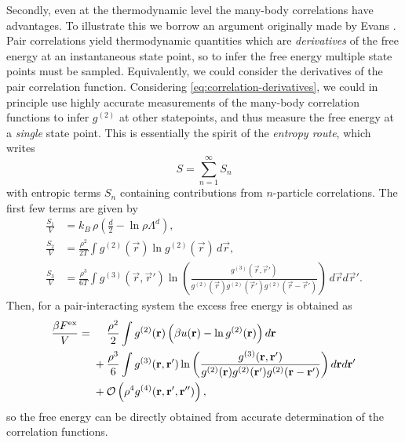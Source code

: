 \documentclass[11pt,twoside]{report}
\begin{document}
Secondly, even at the thermodynamic level the many-body correlations have advantages.
To illustrate this we borrow an argument originally made by Evans \cite{EvansPrivate2019}.
Pair correlations yield thermodynamic quantities which are \emph{derivatives} of the free energy at an instantaneous state point, so to infer the free energy multiple state points must be sampled.
Equivalently, we could consider the derivatives of the pair correlation function.
Considering \eqref{eq:correlation-derivatives}, we could in principle use highly accurate measurements of the many-body correlation functions to infer $g^{(2)}$ at other statepoints, and thus measure the free energy at a \emph{single} state point.
This is essentially the spirit of the \emph{entropy route}, which writes \cite{WallaceJCP1987}
\begin{equation}
  S = \sum_{n=1}^\infty S_n
\end{equation}
with entropic terms $S_n$ containing contributions from $n$-particle correlations.
The first few terms are given by \cite{WallaceJCP1987}
\begin{subequations}
  \begin{align}
    \frac{S_1}{V}%
    &=
    k_B \, \rho \left( \frac{d}{2} - \ln{\rho \Lambda^d} \right),
    \\
    \frac{S_2}{V}%
    &=
    \frac{\rho^2}{2 T}
    \int g^{(2)}(\vec{r}) \ln{g^{(2)}(\vec{r})}
    \, d\vec{r},
    \\
    \frac{S_3}{V}%
    &=
    \frac{\rho^3}{6 T}
    \int g^{(3)}(\vec{r}, \vec{r}')
    \ln{\left(
      \frac{
        g^{(3)}(\vec{r}, \vec{r}')
      }{
        g^{(2)}(\vec{r}) g^{(2)}(\vec{r}') g^{(2)}(\vec{r} - \vec{r}')
      }
      \right)}
    \, d\vec{r} d\vec{r}'.
  \end{align}
\end{subequations}
Then, for a pair-interacting system the excess free energy is obtained as
\begin{equation*}
  \begin{split}
    \frac{\beta F^\mathrm{ex}}{V}
    =& \; \hphantom{ + } \;\,
    \frac{\rho^2}{2} \int g^{(2)}(\vec{r})
    \left( \beta u(\vec{r}) - \ln{g^{(2)}(\vec{r})} \right)
    d\vec{r}
    \\ & \;
    + \frac{\rho^3}{6}
    \int g^{(3)}(\vec{r}, \vec{r}')
    \ln{\left(
      \frac{
        g^{(3)}(\vec{r}, \vec{r}')
      }{
        g^{(2)}(\vec{r}) g^{(2)}(\vec{r}') g^{(2)}(\vec{r} - \vec{r}')
      }
      \right)}
    \, d\vec{r} d\vec{r}'
    \\ & \;
    + \mathcal{O}\left( \rho^4 g^{(4)}(\vec{r}, \vec{r}', \vec{r}'') \right),
  \end{split}
\end{equation*}
so the free energy can be directly obtained from accurate determination of the correlation functions.
\end{document}
